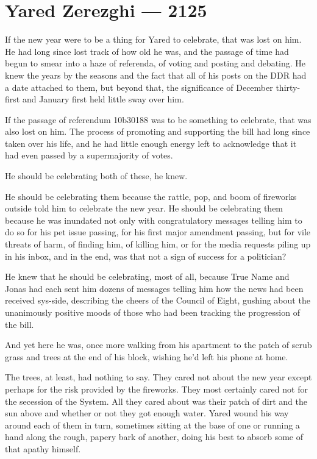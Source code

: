 \hypertarget{yared-zerezghi-2125}{%
\chapter{Yared Zerezghi — 2125}\label{yared-zerezghi-2125}}

If the new year were to be a thing for Yared to celebrate, that was lost on him. He had long since lost track of how old he was, and the passage of time had begun to smear into a haze of referenda, of voting and posting and debating. He knew the years by the seasons and the fact that all of his posts on the DDR had a date attached to them, but beyond that, the significance of December thirty-first and January first held little sway over him.

If the passage of referendum 10b30188 was to be something to celebrate, that was also lost on him. The process of promoting and supporting the bill had long since taken over his life, and he had little enough energy left to acknowledge that it had even passed by a supermajority of votes.

He should be celebrating both of these, he knew.

He should be celebrating them because the rattle, pop, and boom of fireworks outside told him to celebrate the new year. He should be celebrating them because he was inundated not only with congratulatory messages telling him to do so for his pet issue passing, for his first major amendment passing, but for vile threats of harm, of finding him, of killing him, or for the media requests piling up in his inbox, and in the end, was that not a sign of success for a politician?

He knew that he should be celebrating, most of all, because True Name and Jonas had each sent him dozens of messages telling him how the news had been received sys-side, describing the cheers of the Council of Eight, gushing about the unanimously positive moods of those who had been tracking the progression of the bill.

And yet here he was, once more walking from his apartment to the patch of scrub grass and trees at the end of his block, wishing he'd left his phone at home.

The trees, at least, had nothing to say. They cared not about the new year except perhaps for the risk provided by the fireworks. They most certainly cared not for the secession of the System. All they cared about was their patch of dirt and the sun above and whether or not they got enough water. Yared wound his way around each of them in turn, sometimes sitting at the base of one or running a hand along the rough, papery bark of another, doing his best to absorb some of that apathy himself.

